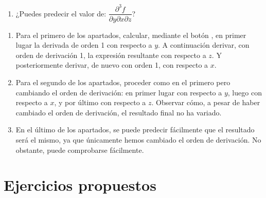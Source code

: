 \begin{enumerate}[leftmargin=*]
\begin{enumerate}
\begin{enumerate}
\item ¿Puedes predecir el valor de: $\dfrac{{\partial ^3 f}}
{{\partial y\partial x\partial z}}$?

\end{enumerate}

\begin{indication}
{
\begin{enumerate}

\item Para el primero de los apartados, calcular, mediante el
botón , en primer lugar la derivada de
orden 1 con respecto a $y$. A continuación derivar, con orden de
derivación 1, la expresión resultante con respecto a $z$. Y
posteriormente derivar, de nuevo con orden 1, con respecto a $x$.

\item Para el segundo de los apartados, proceder como en el
primero pero cambiando el orden de derivación: en primer lugar con
respecto a $y$, luego con respecto a $x$, y por último con respecto
a $z$. Observar cómo, a pesar de haber cambiado el orden de
derivación, el resultado final no ha variado.

\item En el último de los apartados, se puede predecir fácilmente
que el resultado será el mismo, ya que únicamente hemos cambiado el
orden de derivación. No obstante, puede comprobarse fácilmente.

\end{enumerate}

}
\end{indication}


\end{enumerate}
\end{enumerate}


\section{Ejercicios propuestos}


